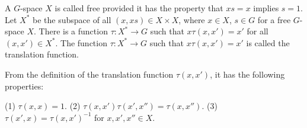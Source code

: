 A $G$-space $X$ is called free provided it has the property that $xs = x$ implies $s = 1$. Let $X^*$ be the subspace of all $(x, xs) \in X \times X$, where $x \in X$, $s \in G$ for a free $G$-space $X$. There is a function $\tau: X^* \rightarrow G$ such that $x\tau(x, x') = x'$ for all $(x, x') \in X^*$. The function $\tau: X^* \rightarrow G$ such that $x\tau(x, x') = x'$ is called the translation function.

From the definition of the translation function $\tau(x, x')$, it has the following properties:

(1) $\tau(x, x) = 1$.
(2) $\tau(x, x')\tau(x', x'') = \tau(x, x'')$.
(3) $\tau(x', x) = \tau(x, x')^{-1}$ for $x, x', x'' \in X$.
